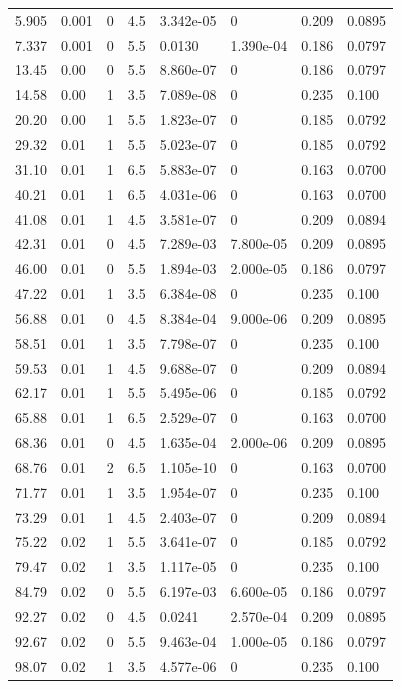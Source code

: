 \documentclass[preview]{standalone}
\begin{document}
{{\begin{tabular}{L{1.2cm}C{1.2cm} C{0.3cm}C{0.5cm} C{1.4cm}C{1.4cm} C{1.4cm}C{1.4cm}}
  5.905  &  0.001  & 0     & 4.5 &  3.342e-05  & 0  & 0.209 &  0.0895   \\ 
  7.337  &  0.001  & 0     & 5.5 &  0.0130  & 1.390e-04  & 0.186 &  0.0797   \\ 
  13.45  &  0.00  & 0     & 5.5 &  8.860e-07  & 0  & 0.186 &  0.0797   \\ 
  14.58  &  0.00  & 1     & 3.5 &  7.089e-08  & 0  & 0.235 &  0.100   \\ 
  20.20  &  0.00  & 1     & 5.5 &  1.823e-07  & 0  & 0.185 &  0.0792   \\ 
  29.32  &  0.01  & 1     & 5.5 &  5.023e-07  & 0  & 0.185 &  0.0792   \\ 
  31.10  &  0.01  & 1     & 6.5 &  5.883e-07  & 0  & 0.163 &  0.0700   \\ 
  40.21  &  0.01  & 1     & 6.5 &  4.031e-06  & 0  & 0.163 &  0.0700   \\ 
  41.08  &  0.01  & 1     & 4.5 &  3.581e-07  & 0  & 0.209 &  0.0894   \\ 
  42.31  &  0.01  & 0     & 4.5 &  7.289e-03  & 7.800e-05  & 0.209 &  0.0895   \\ 
  46.00  &  0.01  & 0     & 5.5 &  1.894e-03  & 2.000e-05  & 0.186 &  0.0797   \\ 
  47.22  &  0.01  & 1     & 3.5 &  6.384e-08  & 0  & 0.235 &  0.100   \\ 
  56.88  &  0.01  & 0     & 4.5 &  8.384e-04  & 9.000e-06  & 0.209 &  0.0895   \\ 
  58.51  &  0.01  & 1     & 3.5 &  7.798e-07  & 0  & 0.235 &  0.100   \\ 
  59.53  &  0.01  & 1     & 4.5 &  9.688e-07  & 0  & 0.209 &  0.0894   \\ 
  62.17  &  0.01  & 1     & 5.5 &  5.495e-06  & 0  & 0.185 &  0.0792   \\ 
  65.88  &  0.01  & 1     & 6.5 &  2.529e-07  & 0  & 0.163 &  0.0700   \\ 
  68.36  &  0.01  & 0     & 4.5 &  1.635e-04  & 2.000e-06  & 0.209 &  0.0895   \\ 
  68.76  &  0.01  & 2     & 6.5 &  1.105e-10  & 0  & 0.163 &  0.0700   \\ 
  71.77  &  0.01  & 1     & 3.5 &  1.954e-07  & 0  & 0.235 &  0.100   \\ 
  73.29  &  0.01  & 1     & 4.5 &  2.403e-07  & 0  & 0.209 &  0.0894   \\ 
  75.22  &  0.02  & 1     & 5.5 &  3.641e-07  & 0  & 0.185 &  0.0792   \\ 
  79.47  &  0.02  & 1     & 3.5 &  1.117e-05  & 0  & 0.235 &  0.100   \\ 
  84.79  &  0.02  & 0     & 5.5 &  6.197e-03  & 6.600e-05  & 0.186 &  0.0797   \\ 
  92.27  &  0.02  & 0     & 4.5 &  0.0241  & 2.570e-04  & 0.209 &  0.0895   \\ 
  92.67  &  0.02  & 0     & 5.5 &  9.463e-04  & 1.000e-05  & 0.186 &  0.0797   \\ 
  98.07  &  0.02  & 1     & 3.5 &  4.577e-06  & 0  & 0.235 &  0.100   \\ 
\hline 
\end{tabular} 

}}
\end{document}
